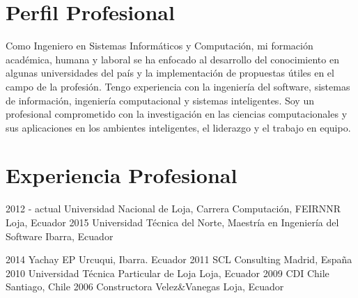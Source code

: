 \documentclass[]{cv-style} %
\begin{document}
\section{Perfil Profesional}
  \vspace{-0.3cm}
\small
Como Ingeniero en Sistemas Informáticos y Computación, mi formación académica, humana y laboral se ha enfocado al desarrollo del conocimiento en algunas universidades del país y la implementación de propuestas útiles en el campo de la profesión. Tengo experiencia con la ingeniería del software, sistemas de información, ingeniería computacional y sistemas inteligentes. Soy un profesional comprometido con la investigación en las ciencias computacionales y sus aplicaciones en los ambientes inteligentes, el liderazgo y el trabajo en equipo.

\section{Experiencia Profesional}
\vspace{-0.3cm}
\begin{entrylist}
\small
\entry
  {2012 - actual}
  {Universidad Nacional de Loja, Carrera Computación, FEIRNNR}
  {Loja, Ecuador}
  { }
\entry
  {2015}
  {Universidad Técnica del Norte, Maestría en Ingeniería del Software}
  {Ibarra, Ecuador}
  { }

\entry
  {2014}
  {Yachay EP}
  {Urcuqui, Ibarra. Ecuador}
  { }
\entry
  {2011}
  {SCL Consulting}
  {Madrid, España}
  { }
 \entry
  {2010}
  {Universidad Técnica Particular de Loja}
  {Loja, Ecuador}
  { }
 \entry
  {2009}
  {CDI Chile}
  {Santiago, Chile}
  { }
\entry
  {2006}
  {Constructora Velez\&Vanegas }
  {Loja, Ecuador}
  { }
\end{entrylist}
\end{document}
